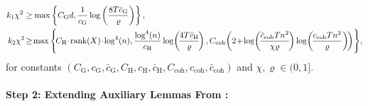 \documentclass[11pt]{article}
\theoremstyle{definition}
\theoremstyle{plain}
\begin{document}
\begin{align}
    k_1 \chi^2 &\geq \max\left\{C_{\mathrm{G}} d, \frac{1}{c_{\mathrm{G}}}\log\left(\frac{8T\bar{c}_{\mathrm{G}}}{\varrho}\right)\right\},\\ 
    k_2\chi^2 \hspace{-0.15em}&\ge\hspace{-0.15em} \max\Bigg\{\hspace{-0.15em}C_{\mathrm{H}} \hspace{-0.15em}\cdot\hspace{-0.15em} \mathrm{rank}(X)\hspace{-0.15em}\cdot\hspace{-0.15em} \log^4(n),\frac{\log^4(n)}{c_{\mathrm{H}}}\log\hspace{-0.15em}\left(\hspace{-0.15em}\frac{4T\bar{c}_{\mathrm{H}}}{\varrho}\hspace{-0.15em}\right), C_{\mathrm{coh}}\hspace{-0.15em}\left(2\hspace{-0.15em}+\hspace{-0.15em}\log\hspace{-0.15em}\left(\hspace{-0.15em}\frac{\bar{c}_{\mathrm{coh}} T n^2}{\chi\varrho}\hspace{-0.15em}\right)\log\hspace{-0.15em}\left(\hspace{-0.15em}\frac{c_{\mathrm{coh}} T n^2}{\varrho}\right)\hspace{-0.15em}\right)\hspace{-0.15em}\Bigg\},
\end{align}
for constants $\left(C_{\mathrm{G}}, c_{\mathrm{G}}, \bar{c}_{\mathrm{G}}, C_{\mathrm{H}}, c_{\mathrm{H}}, \bar{c}_{\mathrm{H}}, C_{\mathrm{coh}}, c_{\mathrm{coh}}, \bar{c}_{\mathrm{coh}}\right)$ and $\chi, \varrho\in (0, 1]$. 


\paragraph{Step 2: Extending Auxiliary Lemmas From \citet{lev2026near}:}\mbox{}
\end{document}
